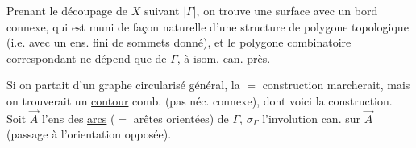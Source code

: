  Prenant le découpage de $X$ suivant $|\Gamma|$, on trouve une surface avec un bord connexe, qui est muni de façon naturelle d'une structure de polygone topologique (i.e. avec un ens. fini  de sommets donné), et le polygone combinatoire correspondant ne dépend que de $\Gamma$, à isom. can. près. 

Si on partait d'un graphe circularisé  général, la $=$ construction marcherait, mais on trouverait un \uline{contour} comb. (pas néc. connexe), dont voici la construction. Soit $\vec A$ l'ens des \uline{arcs} ($=$ arêtes orientées) de $\Gamma$, $\sigma_\Gamma$ l'involution can. sur $\vec A$ (passage à l'orientation opposée).



